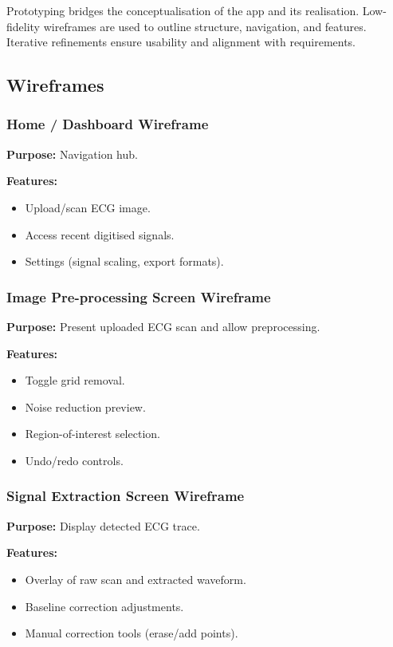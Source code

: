 Prototyping bridges the conceptualisation of the app and its realisation. Low-fidelity wireframes are used to outline structure, navigation, and features. Iterative refinements ensure usability and alignment with requirements.

\subsection{Wireframes}

\subsubsection{Home / Dashboard Wireframe}
\textbf{Purpose:} Navigation hub.

\textbf{Features:}
\begin{itemize}
    \item Upload/scan ECG image.
    \item Access recent digitised signals.
    \item Settings (signal scaling, export formats).
\end{itemize}

\subsubsection{Image Pre-processing Screen Wireframe}
\textbf{Purpose:} Present uploaded ECG scan and allow preprocessing. 

\textbf{Features:}
\begin{itemize}
    \item Toggle grid removal.
    \item Noise reduction preview.
    \item Region-of-interest selection.
    \item Undo/redo controls.
\end{itemize}

\subsubsection{Signal Extraction Screen Wireframe}
\textbf{Purpose:} Display detected ECG trace.  

\textbf{Features:}
\begin{itemize}
    \item Overlay of raw scan and extracted waveform.
    \item Baseline correction adjustments.
    \item Manual correction tools (erase/add points).
\end{itemize}

